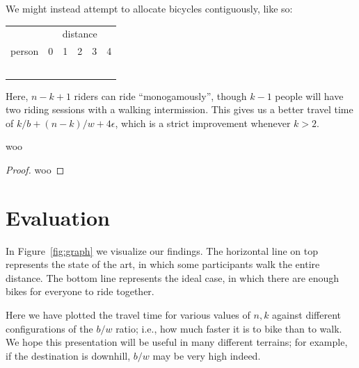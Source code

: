 \documentclass[DIV=calc, paper=a4, fontsize=11pt, twocolumn]{scrartcl}	 %
\newcommand{\initial}[1]{ %
\lettrine[lines=3,lhang=0.3,nindent=0em]{
\color{DarkGoldenrod}
{\textsf{#1}}}{}}
\begin{document}
We might instead attempt to allocate bicycles contiguously, like so:
		\begin{center}
		\begin{tabular}{rp{1.5em}|p{1.5em}|p{1.5em}|p{1.5em}|p{1.5em}|}
		& \multicolumn{5}{c}{distance} \\
		person & \multicolumn{1}{|c|}{0} & \multicolumn{1}{c|}{1} & \multicolumn{1}{c|}{2} & \multicolumn{1}{c|}{3} & \multicolumn{1}{c|}{4} \\
		\hline
		\multicolumn{1}{r|}{\PA} &\BA&\BA&\BA&   & \\
		\cline{2-6}
		\multicolumn{1}{r|}{\PB} &   &\BB&\BB&\BB& \\
		\cline{2-6}
		\multicolumn{1}{r|}{\PC} &   &   &\BC&\BC&\BC\\
		\cline{2-6}
		\multicolumn{1}{r|}{\PD} &\BB&   &   &\BA&\BA\\
		\cline{2-6}
		\multicolumn{1}{r|}{\PE} &\BC&\BC&   &   &\BB\\
		\cline{2-6}
		\end{tabular}
		\end{center}

Here, $n-k+1$ riders can ride ``monogamously'', though $k-1$ people will have two riding  sessions with a walking intermission. This gives us a better travel time of $k/b+(n-k)/w + 4\epsilon$, which is a strict improvement whenever $k>2$.

\begin{theorem}
woo
\end{theorem}
\begin{proof}
woo
\end{proof}

\section{Evaluation}

\initial{I}n Figure~\ref{fig:graph} we visualize our findings.
The horizontal line on top represents the state of the art, in which some participants walk the entire distance.
The bottom line represents the ideal case, in which there are enough bikes for everyone to ride together.

Here we have plotted the travel time for various values of $n,k$ against different configurations of the $b/w$ ratio; i.e., how much faster it is to bike than to walk.
We hope this presentation will be useful in many different terrains; for example, if the destination is downhill, $b/w$ may be very high indeed.
\end{document}
